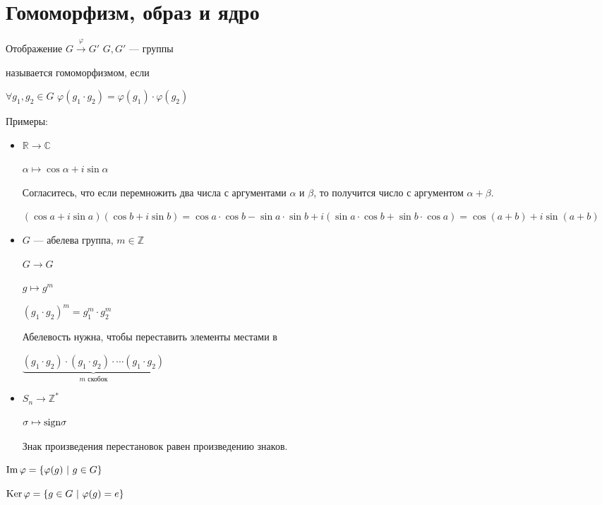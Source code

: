 \section{Гомоморфизм, образ и ядро}

\begin{conj}
    Отображение $G \stackrel{\varphi}{\longrightarrow} G'$ $G, G'$ --- группы
  
    называется гомоморфизмом, если 
  
    $\forall g_1, g_2 \in G$ $\varphi(g_1 \cdot g_2) = \varphi(g_1) \cdot \varphi(g_2)$
  \end{conj}
  
  Примеры:
  \begin{itemize}
    \item $\mathbb{R} \longrightarrow \mathbb{C}$
    
    $\alpha \mapsto \cos{\alpha} + i\sin{\alpha}$
  
    Согласитесь, что если перемножить два числа с аргументами $\alpha$ и $\beta$, то получится число с аргументом $\alpha + \beta$.
  
    $(\cos{a} + i\sin{a})(\cos{b} + i\sin{b}) = \cos{a}\cdot\cos{b} - \sin{a}\cdot\sin{b} + i(\sin{a}\cdot\cos{b} + \sin{b}\cdot\cos{a}) = \cos(a + b) + i\sin(a + b)$
  
    \item $G$ --- абелева группа, $m\in \mathbb{Z}$
    
    $G \longrightarrow G$
  
    $g \mapsto g^m$
  
    $(g_1 \cdot g_2)^m = g_1^m \cdot g_2^m$
    
    Абелевость нужна, чтобы переставить элементы местами в 
    
    $\underbrace{(g_1 \cdot g_2) \cdot (g_1 \cdot g_2) \cdot \cdots (g_1 \cdot g_2)}_{m \text{ скобок}}$
  
    \item  $S_n \longrightarrow \mathbb{Z}^*$
  
    $\sigma \mapsto \operatorname{sign \sigma}$
  
    Знак произведения перестановок равен произведению знаков.
  \end{itemize}
  
  \begin{conj}
    $\operatorname{Im} {\varphi} = \{ \varphi(g)\ |\ g\in G \}$
  
    $\operatorname{Ker}{\varphi} = \{ g \in G\ |\ \varphi(g) = e \}$
  \end{conj}
  
